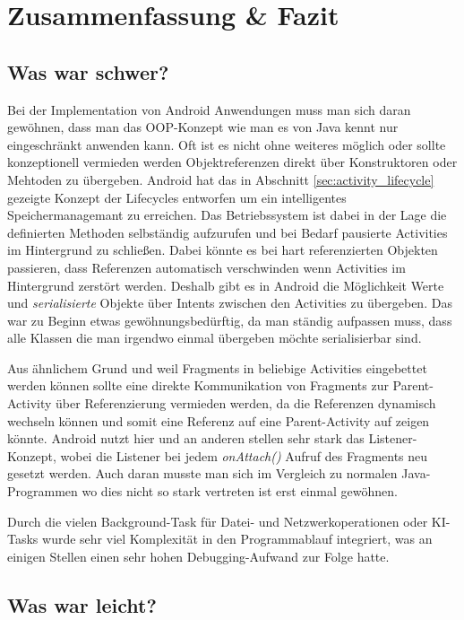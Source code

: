 \chapter{Zusammenfassung \& Fazit}
\section{Was war schwer?}

Bei der Implementation von Android Anwendungen muss man sich daran gewöhnen, dass man das OOP-Konzept wie man es von Java kennt nur eingeschränkt anwenden kann. Oft ist es nicht ohne weiteres möglich oder sollte konzeptionell vermieden werden Objektreferenzen direkt über Konstruktoren oder Mehtoden zu übergeben. Android hat das in Abschnitt \ref{sec:activity_lifecycle} gezeigte Konzept der Lifecycles entworfen um ein intelligentes Speichermanagemant zu erreichen. Das Betriebssystem ist dabei in der Lage die definierten Methoden selbständig aufzurufen und bei Bedarf pausierte Activities im Hintergrund zu schließen. Dabei könnte es bei hart referenzierten Objekten passieren, dass Referenzen automatisch verschwinden wenn Activities im Hintergrund zerstört werden. Deshalb gibt es in Android die Möglichkeit Werte und \emph{serialisierte} Objekte über Intents zwischen den Activities  zu übergeben. Das war zu Beginn etwas gewöhnungsbedürftig, da man ständig aufpassen muss, dass alle Klassen die man irgendwo einmal übergeben möchte serialisierbar sind.

Aus ähnlichem Grund und weil Fragments in beliebige Activities eingebettet werden können sollte eine direkte Kommunikation von Fragments zur Parent-Activity über Referenzierung vermieden werden, da die Referenzen dynamisch wechseln können und somit eine Referenz auf eine Parent-Activity auf  zeigen könnte. Android nutzt hier und an anderen stellen sehr stark das Listener-Konzept, wobei die Listener bei jedem \emph{onAttach()} Aufruf des Fragments neu gesetzt werden. 
Auch daran musste man sich im Vergleich zu normalen Java-Programmen wo dies nicht so stark vertreten ist erst einmal gewöhnen. 

Durch die vielen Background-Task für Datei- und Netzwerkoperationen oder KI-Tasks wurde sehr viel Komplexität in den Programmablauf integriert, was an einigen Stellen einen sehr hohen Debugging-Aufwand zur Folge hatte. 

\section{Was war leicht?}

